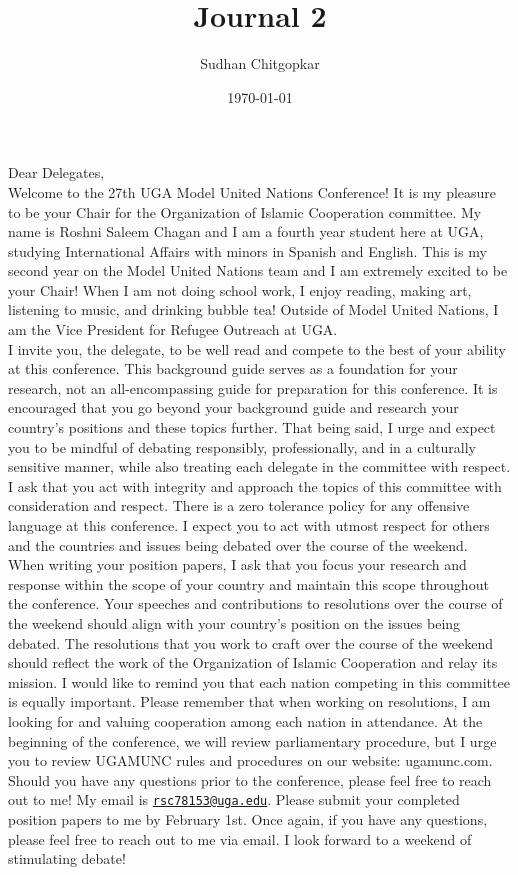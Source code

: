 \documentclass[10pt, letterpaper]{article}
\title{Journal 2}
\author{Sudhan Chitgopkar}
\date{\today}
\begin{document}
Dear Delegates, \\

Welcome to the 27th UGA Model United Nations Conference! It is my
pleasure to be your Chair for the Organization of Islamic Cooperation
committee. My name is Roshni Saleem Chagan and I am a fourth year
student here at UGA, studying International Affairs with minors in
Spanish and English. This is my second year on the Model United Nations
team and I am extremely excited to be your Chair! When I am not doing
school work, I enjoy reading, making art, listening to music, and
drinking bubble tea! Outside of Model United Nations, I am the Vice
President for Refugee Outreach at UGA. \\

I invite you, the delegate, to be well read and compete to the best of
your ability at this conference. This background guide serves as a
foundation for your research, not an all-encompassing guide for
preparation for this conference. It is encouraged that you go beyond
your background guide and research your country's positions and these
topics further. That being said, I urge and expect you to be mindful of
debating responsibly, professionally, and in a culturally sensitive
manner, while also treating each delegate in the committee with respect.
I ask that you act with integrity and approach the topics of this
committee with consideration and respect. There is a zero tolerance
policy for any offensive language at this conference. I expect you to
act with utmost respect for others and the countries and issues being
debated over the course of the weekend. \\

When writing your position papers, I ask that you focus your research
and response within the scope of your country and maintain this scope
throughout the conference. Your speeches and contributions to
resolutions over the course of the weekend should align with your
country's position on the issues being debated. The resolutions that you
work to craft over the course of the weekend should reflect the work of
the Organization of Islamic Cooperation and relay its mission. I would
like to remind you that each nation competing in this committee is
equally important. Please remember that when working on resolutions, I
am looking for and valuing cooperation among each nation in attendance.
At the beginning of the conference, we will review parliamentary
procedure, but I urge you to review UGAMUNC rules and procedures on our
website: ugamunc.com. Should you have any questions prior to the
conference, please feel free to reach out to me! My email is
\texttt{\href{mailto:rsc78153@uga.edu}{{rsc78153@uga.edu}}}. Please
submit your completed position papers to me by February 1st. Once again,
if you have any questions, please feel free to reach out to me via
email. I look forward to a weekend of stimulating debate! \\
\end{document}
